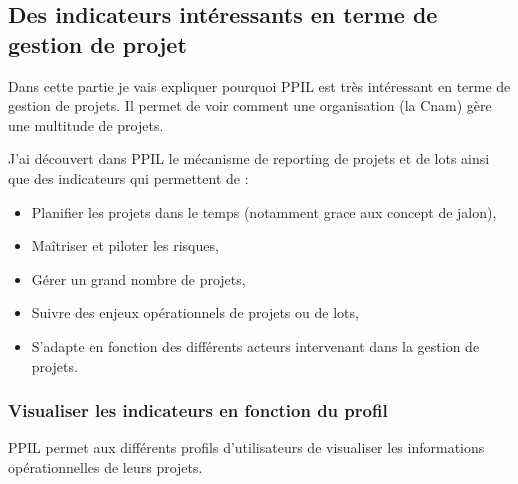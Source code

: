 \subsection{Des indicateurs intéressants en terme de gestion de projet}

Dans cette partie je vais expliquer pourquoi PPIL est très intéressant en terme de gestion de projets. Il permet de voir comment une organisation (la Cnam) gère une multitude de projets.

J'ai découvert dans PPIL le mécanisme de reporting de projets et de lots ainsi que des indicateurs qui permettent de :
\begin{itemize}
    \item Planifier les projets dans le temps (notamment grace aux concept de jalon),
    \item Maîtriser et piloter les risques,
    \item Gérer un grand nombre de projets,
    \item Suivre des enjeux opérationnels de projets ou de lots,
    \item S'adapte en fonction des différents acteurs intervenant dans la gestion de projets.
\end{itemize}

\subsubsection{Visualiser les indicateurs en fonction du profil}

PPIL permet aux différents profils d'utilisateurs de visualiser les informations opérationnelles de leurs projets.

